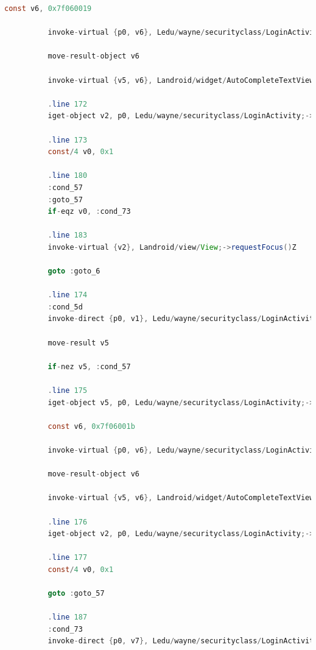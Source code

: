 \documentclass[onecolumn,oneside]{SUSTechHomework}
\begin{document}
\begin{lstlisting}[language={java}]
          const v6, 0x7f060019
      
          invoke-virtual {p0, v6}, Ledu/wayne/securityclass/LoginActivity;->getString(I)Ljava/lang/String;
      
          move-result-object v6
      
          invoke-virtual {v5, v6}, Landroid/widget/AutoCompleteTextView;->setError(Ljava/lang/CharSequence;)V
      
          .line 172
          iget-object v2, p0, Ledu/wayne/securityclass/LoginActivity;->mEmailView:Landroid/widget/AutoCompleteTextView;
      
          .line 173
          const/4 v0, 0x1
      
          .line 180
          :cond_57
          :goto_57
          if-eqz v0, :cond_73
      
          .line 183
          invoke-virtual {v2}, Landroid/view/View;->requestFocus()Z
      
          goto :goto_6
      
          .line 174
          :cond_5d
          invoke-direct {p0, v1}, Ledu/wayne/securityclass/LoginActivity;->isEmailValid(Ljava/lang/String;)Z
      
          move-result v5
      
          if-nez v5, :cond_57
      
          .line 175
          iget-object v5, p0, Ledu/wayne/securityclass/LoginActivity;->mEmailView:Landroid/widget/AutoCompleteTextView;
      
          const v6, 0x7f06001b
      
          invoke-virtual {p0, v6}, Ledu/wayne/securityclass/LoginActivity;->getString(I)Ljava/lang/String;
      
          move-result-object v6
      
          invoke-virtual {v5, v6}, Landroid/widget/AutoCompleteTextView;->setError(Ljava/lang/CharSequence;)V
      
          .line 176
          iget-object v2, p0, Ledu/wayne/securityclass/LoginActivity;->mEmailView:Landroid/widget/AutoCompleteTextView;
      
          .line 177
          const/4 v0, 0x1
      
          goto :goto_57
      
          .line 187
          :cond_73
          invoke-direct {p0, v7}, Ledu/wayne/securityclass/LoginActivity;->showProgress(Z)V
      

\end{lstlisting}
\end{document}
